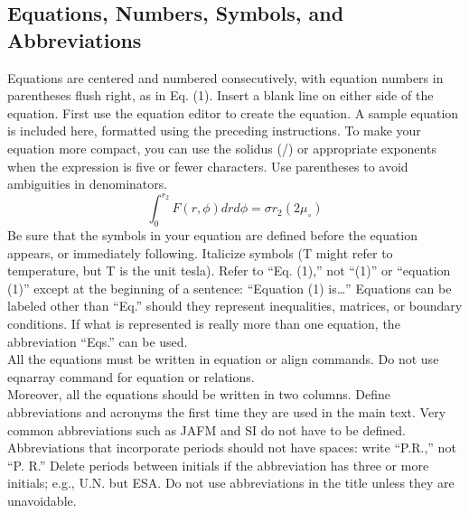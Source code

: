 \documentclass{jafm}
\begin{document}
\subsection{Equations, Numbers, Symbols, and Abbreviations}
Equations are centered and numbered consecutively, with equation numbers in parentheses flush right, as in Eq. (1). Insert a blank line on either side of the equation. First use the equation editor to create the equation. 
A sample equation is included here, formatted using the preceding instructions. To make your equation more compact, you can use the solidus (/) or appropriate exponents when the expression is five or fewer characters.  Use parentheses to avoid ambiguities in denominators.
\begin{equation}
\int_0^{r_2} F(r , \phi) dr d\phi = \sigma r_2 (2\mu_{\circ})
\end{equation}
Be sure that the symbols in your equation are defined before the equation appears, or immediately following. Italicize symbols (T might refer to temperature, but T is the unit tesla). Refer to ``Eq. (1),'' not ``(1)'' or ``equation (1)'' except at the beginning of a sentence: ``Equation (1) is\ldots'' Equations can be labeled other than ``Eq.'' should they represent inequalities, matrices, or boundary conditions. If what is represented is really more than one equation, the abbreviation ``Eqs.'' can be used.\\
All the equations must be written in equation or align commands. Do not use eqnarray command for equation or relations.\\
Moreover, all the equations should be written in two columns.   
Define abbreviations and acronyms the first time they are used in the main text. Very common abbreviations such as JAFM and SI do not have to be defined. Abbreviations that incorporate periods should not have spaces: write ``P.R.,'' not ``P. R.'' Delete periods between initials if the abbreviation has three or more initials; e.g., U.N. but ESA. Do not use abbreviations in the title unless they are unavoidable.
\end{document}
